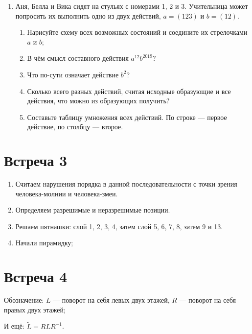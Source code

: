 \documentclass[a4paper, 12pt]{article}
\begin{document}
\begin{enumerate}


 
  \item Аня, Белла и Вика сидят на стульях с номерами 1, 2 и 3. Учительница может попросить их выполнить одно из двух действий, $a=(123)$ и $b=(12)$.  
    \begin{enumerate}
      \item Нарисуйте схему всех возможных состояний и соедините их стрелочками $a$ и $b$;
      \item В чём смысл составного действия $a^{12}b^{2019}$?
      \item Что по-сути означает действие $b^2$?
      \item Сколько всего разных действий, считая исходные образующие и все действия, что можно из образующих получить?
      \item Составьте таблицу умножения всех действий. По строке — первое действие, по столбцу — второе.
    \end{enumerate}

\end{enumerate}


\section{Встреча 3}


\begin{enumerate}
  \item Считаем нарушения порядка в данной последовательности с точки зрения человека-молнии и человека-змеи.
  \item Определяем разрешимые и неразрешимые позиции.
  \item Решаем пятнашки: слой 1, 2, 3, 4, затем слой 5, 6, 7, 8, затем 9 и 13.
  \item Начали пирамидку;
\end{enumerate}

\section{Встреча 4}

Обозначение: $L$ — поворот на себя левых двух этажей, $R$ — поворот на себя правых двух этажей;

И ещё: $\tilde L = RLR^{-1}$.
\end{document}
